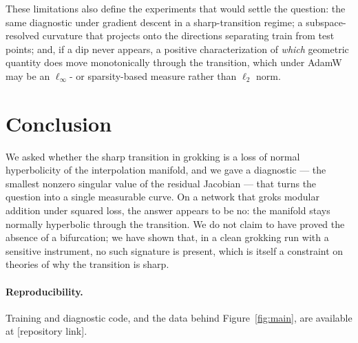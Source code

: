 \documentclass[11pt]{article}
\begin{document}
These limitations also define the experiments that would settle the question:
the same diagnostic under gradient descent in a sharp-transition regime; a
subspace-resolved curvature that projects onto the directions separating train
from test points; and, if a dip never appears, a positive characterization of
\emph{which} geometric quantity does move monotonically through the transition,
which under AdamW may be an $\ell_\infty$- or sparsity-based measure rather than
$\ell_2$ norm.

\section{Conclusion}
We asked whether the sharp transition in grokking is a loss of normal
hyperbolicity of the interpolation manifold, and we gave a diagnostic --- the
smallest nonzero singular value of the residual Jacobian --- that turns the
question into a single measurable curve. On a network that groks modular
addition under squared loss, the answer appears to be no: the manifold stays
normally hyperbolic through the transition. We do not claim to have proved the
absence of a bifurcation; we have shown that, in a clean grokking run with a
sensitive instrument, no such signature is present, which is itself a
constraint on theories of why the transition is sharp.

\paragraph{Reproducibility.} Training and diagnostic code, and the data behind
Figure~\ref{fig:main}, are available at [repository link].
\end{document}
